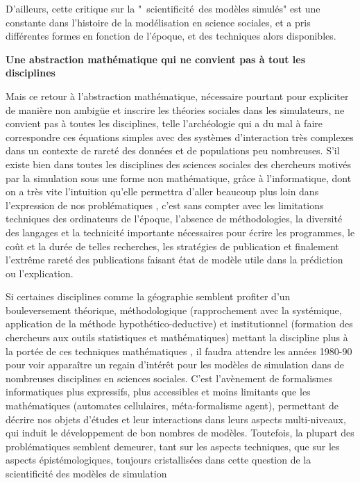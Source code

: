 D’ailleurs, cette critique sur la " scientificité des modèles simulés" est une constante dans l'histoire de la modélisation en science sociales, et a pris différentes formes en fonction de l'époque, et des techniques alors disponibles.

\textbf{Une abstraction mathématique qui ne convient pas à tout les disciplines }

Mais ce retour à l'abstraction mathématique, nécessaire pourtant pour expliciter de manière non ambigüe et inscrire les théories sociales dans les simulateurs, ne convient pas à toutes les disciplines, telle l'archéologie qui a du mal à faire correspondre ces équations simples avec des systèmes d'interaction très complexes \autocite{Kohler2011} dans un contexte de rareté des données et de populations peu nombreuses. S’il existe bien dans toutes les disciplines des sciences sociales des chercheurs motivés par la simulation sous une forme non mathématique, grâce à l’informatique, dont on a très vite l'intuition qu'elle permettra d'aller beaucoup plus loin dans l'expression de nos problématiques \autocite{Doran1970}, c'est sans compter avec les limitations techniques des ordinateurs de l'époque, l'absence de méthodologies, la diversité des langages et la technicité importante nécessaires pour écrire les programmes, le coût et la durée de telles recherches, les stratégies de publication et finalement l’extrême rareté des publications faisant état de modèle utile dans la prédiction ou l'explication.

Si certaines disciplines comme la géographie semblent profiter d'un bouleversement théorique, méthodologique (rapprochement avec la systémique, application de la méthode hypothético-deductive) et institutionnel (formation des chercheurs aux outils statistiques et mathématiques) mettant la discipline plus à la portée de ces techniques mathématiques \cite{Pumain2002},  il faudra attendre les années 1980-90 pour voir apparaître un regain d'intérêt pour les modèles de simulation dans de nombreuses disciplines en sciences sociales. C'est l'avènement de formalismes informatiques plus expressifs, plus accessibles et moins limitants que les mathématiques (automates cellulaires, méta-formalisme agent), permettant de décrire nos objets d'études et leur interactions dans leurs aspects multi-niveaux, qui induit le développement de bon nombres de modèles. Toutefois, la plupart des problématiques semblent demeurer, tant sur les aspects techniques, que sur les aspects épistémologiques, toujours cristallisées dans cette question de la scientificité des modèles de simulation 

